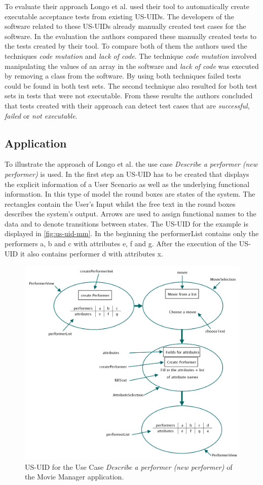 To evaluate their approach Longo et al. used their tool to automatically create executable acceptance tests from existing US-UIDs.
The developers of the software related to these US-UIDs already manually created test cases for the software.
In the evaluation the authors compared these manually created tests to the tests created by their tool.
To compare both of them the authors used the techniques \textit{code mutation} and \textit{lack of code}.
The technique \textit{code mutation} involved manipulating the values of an array in the software and \textit{lack of code} was executed by removing a class from the software.
By using both techniques failed tests could be found in both test sets.
The second technique also resulted for both test sets in tests that were not executable.
From these results the authors concluded that tests created with their approach can detect test cases that are \textit{successful}, \textit{failed} or \textit{not executable}.

\subsection{Application}

To illustrate the approach of Longo et al. the use case \textit{Describe a performer (new performer)} is used.
In the first step an US-UID has to be created that displays the explicit information of a User Scenario as well as the underlying functional information.
In this type of model the round boxes are states of the system.
The rectangles contain the User's Input whilst the free text in the round boxes describes the system's output.
Arrows are used to assign functional names to the data and to denote transitions between states.
The US-UID for the example is displayed in \autoref{fig:us-uid-mm}.
In the beginning the performerList contains only the performers a, b and c with attributes e, f and g.
After the execution of the US-UID it also contains performer d with attributes x.


\begin{figure}[tbh]
	\centering
	\includegraphics[width=.85\textwidth]{../images/US-UID.png}
	\caption{US-UID for the Use Case \textit{Describe a performer (new performer)} of the Movie Manager application.}
	\label{fig:us-uid-mm}
\end{figure}

